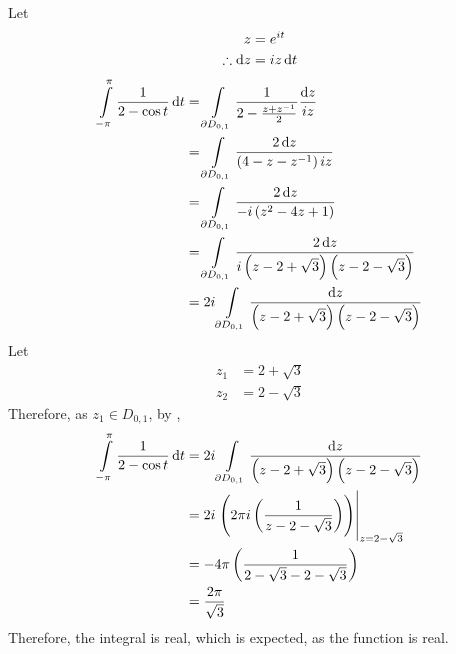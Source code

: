 \documentclass[titlepage, fleqn, a4paper, 12pt, twoside]{article}
\theoremstyle{definition}
\theoremstyle{theorem}
\begin{document}
\begin{solution}
	Let
	\begin{align*}
		z                 & = e^{i t} \\
		\therefore \dif z & = i z \dif t
	\end{align*}
	\begin{align*}
		\int\limits_{-\pi}^{\pi} \frac{1}{2 - \cos t} \dif t & = \int\limits_{\partial D_{0,1}} \frac{1}{2 - \frac{z + z^{-1}}{2}} \frac{\dif z}{i z}                              \\
                                                                     & = \int\limits_{\partial D_{0,1}} \frac{2 \dif z}{\left( 4 - z - z^{-1} \right) i z}                                 \\
                                                                     & = \int\limits_{\partial D_{0,1}} \frac{2 \dif z}{-i \left( z^2 - 4 z + 1 \right)}                                   \\
                                                                     & = \int\limits_{\partial D_{0,1}} \frac{2 \dif z}{i \left(z -  2 + \sqrt{3} \right) \left( z - 2 - \sqrt{3} \right)} \\
                                                                     & = 2 i \int\limits_{\partial D_{0,1}} \frac{\dif z}{\left( z - 2 + \sqrt{3} \right) \left( z - 2 - \sqrt{3} \right)}
	\end{align*}
	Let
	\begin{align*}
		z_1 & = 2 + \sqrt{3} \\
		z_2 & = 2 - \sqrt{3}
	\end{align*}
	Therefore, as $z_1 \in D_{0,1}$, by ,
	\begin{align*}
		\int\limits_{-\pi}^{\pi} \frac{1}{2 - \cos t} \dif t & = 2 i \int\limits_{\partial D_{0,1}} \frac{\dif z}{\left( z - 2 + \sqrt{3} \right) \left( z - 2 - \sqrt{3} \right)} \\
                                                                     & = 2 i \left. \left( 2 \pi i \left( \frac{1}{z - 2 - \sqrt{3}} \right) \right) \right|_{z = 2 - \sqrt{3}}            \\
                                                                     & = -4 \pi \left( \frac{1}{2 - \sqrt{3} - 2 - \sqrt{3}} \right)                                                       \\
                                                                     & = \frac{2 \pi}{\sqrt{3}}
	\end{align*}
	Therefore, the integral is real, which is expected, as the function is real.
\end{solution}
\end{document}
